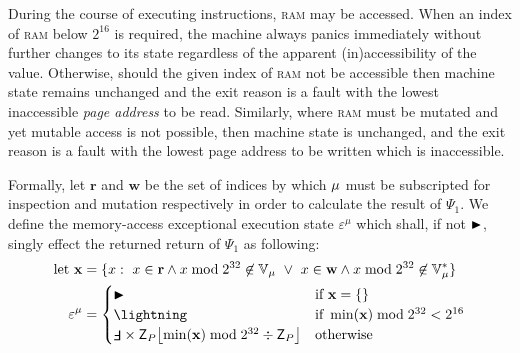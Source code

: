 During the course of executing instructions, \textsc{ram} may be accessed. When an index of \textsc{ram} below $2^{16}$ is required, the machine always panics immediately without further changes to its state regardless of the apparent (in)accessibility of the value. Otherwise, should the given index of \textsc{ram} not be accessible then machine state remains unchanged and the exit reason is a fault with the lowest inaccessible \emph{page address} to be read. Similarly, where \textsc{ram} must be mutated and yet mutable access is not possible, then machine state is unchanged, and the exit reason is a fault with the lowest page address to be written which is inaccessible.

Formally, let $\mathbf{r}$ and $\mathbf{w}$ be the set of indices by which ${\mu}$ must be subscripted for inspection and mutation respectively in order to calculate the result of $\Psi_1$. We define the memory-access exceptional execution state $\varepsilon^\mu$ which shall, if not $\blacktriangleright$, singly effect the returned return of $\Psi_1$ as following:
\begin{align}
  \using \mathbf{x} &= \{ x :\ x \in \mathbf{r} \wedge x \bmod 2^{32} \not\in \mathbb{V}_\mem\ \vee\ x \in \mathbf{w} \wedge x \bmod 2^{32} \not\in \mathbb{V}^*_\mem \} \\
  \varepsilon^\mu &= \begin{cases}
    \continue &\when \mathbf{x} = \{\} \\
    \panic &\when \min(\mathbf{x}) \bmod 2^{32} < 2^{16} \\
    \fault \times \mathsf{Z}_P\floor{\min(\mathbf{x}) \bmod 2^{32} \div \mathsf{Z}_P} &\otherwise
  \end{cases}
\end{align}

